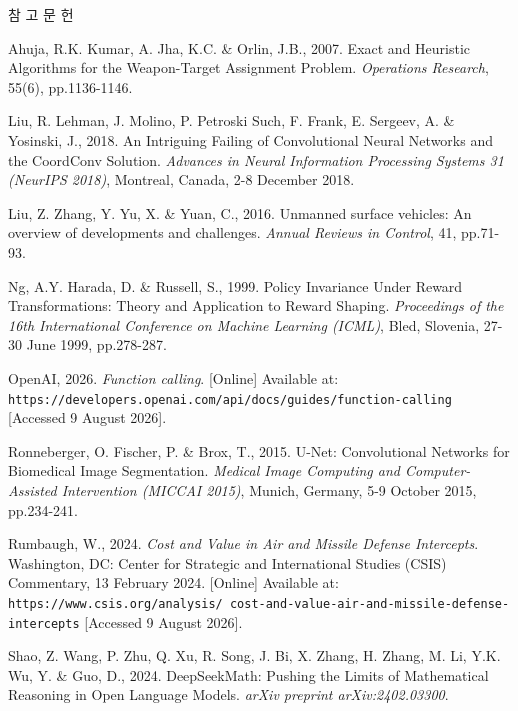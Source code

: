 \documentclass[10pt,twocolumn]{extarticle}
\newenvironment{snakreferences}
  {\par{\centering\fontsize{15}{22.5}\selectfont 참 고 문 헌\par}\vspace{6pt}%
   \fontsize{9.5}{14.25}\selectfont
   \setlength{\parindent}{-7.1mm}\setlength{\leftskip}{7.1mm}}
  {\par}
\begin{document}
\begin{snakreferences}

Ahuja, R.K. Kumar, A. Jha, K.C. \& Orlin, J.B., 2007. Exact and Heuristic
Algorithms for the Weapon-Target Assignment Problem. \textit{Operations
Research}, 55(6), pp.1136-1146.

Liu, R. Lehman, J. Molino, P. Petroski Such, F. Frank, E. Sergeev, A. \&
Yosinski, J., 2018. An Intriguing Failing of Convolutional Neural Networks and
the CoordConv Solution. \textit{Advances in Neural Information Processing
Systems 31 (NeurIPS 2018)}, Montreal, Canada, 2-8 December 2018.

Liu, Z. Zhang, Y. Yu, X. \& Yuan, C., 2016. Unmanned surface vehicles: An
overview of developments and challenges. \textit{Annual Reviews in Control}, 41,
pp.71-93.

Ng, A.Y. Harada, D. \& Russell, S., 1999. Policy Invariance Under Reward
Transformations: Theory and Application to Reward Shaping. \textit{Proceedings
of the 16th International Conference on Machine Learning (ICML)}, Bled,
Slovenia, 27-30 June 1999, pp.278-287.

OpenAI, 2026. \textit{Function calling}. [Online] Available at:
\texttt{https://developers.openai.com/api/docs/guides/function-calling}
[Accessed 9 August 2026].

Ronneberger, O. Fischer, P. \& Brox, T., 2015. U-Net: Convolutional Networks for
Biomedical Image Segmentation. \textit{Medical Image Computing and
Computer-Assisted Intervention (MICCAI 2015)}, Munich, Germany,
5-9 October 2015, pp.234-241.

Rumbaugh, W., 2024. \textit{Cost and Value in Air and Missile Defense
Intercepts}. Washington, DC: Center for Strategic and International Studies
(CSIS) Commentary, 13 February 2024. [Online] Available at:
\texttt{https://www.csis.org/\allowbreak analysis/\allowbreak
cost-and-value-air-and-\allowbreak missile-defense-intercepts}
[Accessed 9 August 2026].

Shao, Z. Wang, P. Zhu, Q. Xu, R. Song, J. Bi, X. Zhang, H. Zhang, M. Li, Y.K.
Wu, Y. \& Guo, D., 2024. DeepSeekMath: Pushing the Limits of Mathematical
Reasoning in Open Language Models. \textit{arXiv preprint arXiv:2402.03300}.


\end{snakreferences}
\end{document}
